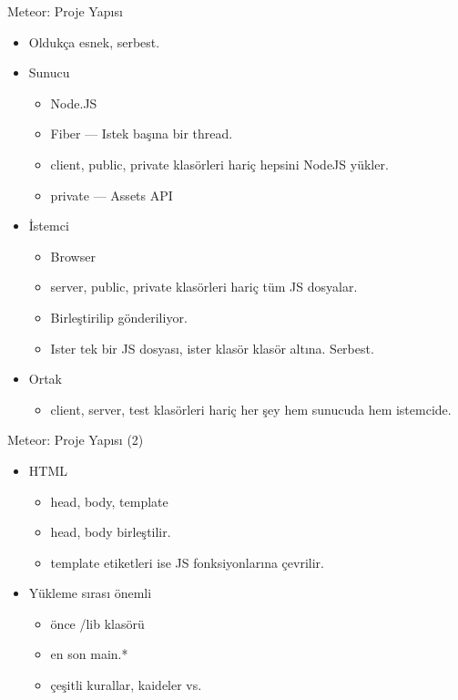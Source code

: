 \documentclass{beamer}
\begin{document}
    \begin{frame}{Meteor: Proje Yap{\i}s{\i}}
        \begin{itemize}
            \item Oldukça esnek, serbest.
            \item Sunucu
                \begin{itemize}
                    \item Node.JS
                    \item Fiber --- Istek başına bir thread.
                    \item client, public, private klasörleri hariç hepsini NodeJS yükler.
                    \item private --- Assets API
                \end{itemize}
            \item İstemci
                \begin{itemize}
                    \item Browser
                    \item server, public, private klasörleri hariç tüm JS dosyalar.
                    \item Birleştirilip gönderiliyor.
                    \item Ister tek bir JS dosyası, ister klasör klasör altına. Serbest.
                \end{itemize}
            \item Ortak
                \begin{itemize}
                    \item client, server, test klasörleri hariç her şey hem sunucuda hem istemcide.
                \end{itemize}
        \end{itemize}
    \end{frame}

    \begin{frame}{Meteor: Proje Yapısı (2)}
        \begin{itemize}
            \item HTML
                \begin{itemize}
                    \item head, body, template
                    \item head, body birleştilir.
                    \item template etiketleri ise JS fonksiyonlarına çevrilir.
                \end{itemize}
            \item Yükleme sırası önemli
                \begin{itemize}
                    \item önce /lib klasörü
                    \item en son main.*
                    \item çeşitli kurallar, kaideler vs.
                \end{itemize}
        \end{itemize}
    \end{frame}
\end{document}
